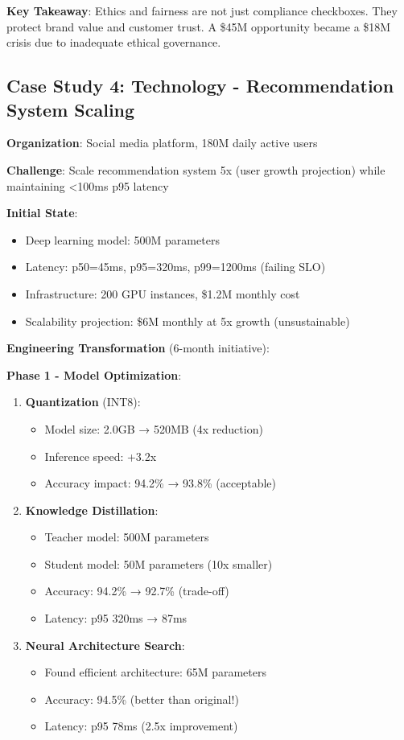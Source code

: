 \textbf{Key Takeaway}: Ethics and fairness are not just compliance checkboxes. They protect brand value and customer trust. A \$45M opportunity became a \$18M crisis due to inadequate ethical governance.

\subsection{Case Study 4: Technology - Recommendation System Scaling}

\textbf{Organization}: Social media platform, 180M daily active users

\textbf{Challenge}: Scale recommendation system 5x (user growth projection) while maintaining <100ms p95 latency

\textbf{Initial State}:
\begin{itemize}
    \item Deep learning model: 500M parameters
    \item Latency: p50=45ms, p95=320ms, p99=1200ms (failing SLO)
    \item Infrastructure: 200 GPU instances, \$1.2M monthly cost
    \item Scalability projection: \$6M monthly at 5x growth (unsustainable)
\end{itemize}

\textbf{Engineering Transformation} (6-month initiative):

\textbf{Phase 1 - Model Optimization}:
\begin{enumerate}
    \item \textbf{Quantization} (INT8):
        \begin{itemize}
            \item Model size: 2.0GB → 520MB (4x reduction)
            \item Inference speed: +3.2x
            \item Accuracy impact: 94.2\% → 93.8\% (acceptable)
        \end{itemize}

    \item \textbf{Knowledge Distillation}:
        \begin{itemize}
            \item Teacher model: 500M parameters
            \item Student model: 50M parameters (10x smaller)
            \item Accuracy: 94.2\% → 92.7\% (trade-off)
            \item Latency: p95 320ms → 87ms
        \end{itemize}

    \item \textbf{Neural Architecture Search}:
        \begin{itemize}
            \item Found efficient architecture: 65M parameters
            \item Accuracy: 94.5\% (better than original!)
            \item Latency: p95 78ms (2.5x improvement)
        \end{itemize}
\end{enumerate}

